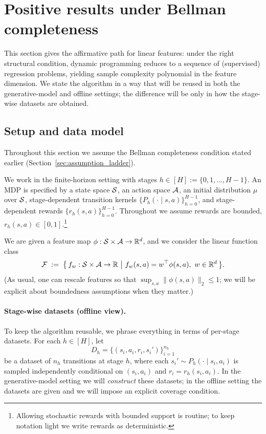 \section{Positive results under Bellman completeness}
\label{sec:BC_positive}

This section gives the affirmative path for linear features: under the right
structural condition, dynamic programming reduces to a sequence of (supervised)
regression problems, yielding sample complexity polynomial in the feature
dimension. We state the algorithm in a way that will be reused in both the
generative-model and offline settings; the difference will be only in how the
stage-wise datasets are obtained.

\subsection{Setup and data model}
\label{subsec:BC_setup}

Throughout this section we assume the Bellman completeness condition stated earlier
(Section~\ref{sec:assumption_ladder}).

We work in the finite-horizon setting with stages $h\in[H] := \{0,1,\dots,H-1\}$.
An MDP is specified by a state space $\mathcal{S}$, an action space $\mathcal{A}$, an initial
distribution $\mu$ over $\mathcal{S}$, stage-dependent transition kernels
$\{P_h(\cdot\mid s,a)\}_{h=0}^{H-1}$, and stage-dependent rewards
$\{r_h(s,a)\}_{h=0}^{H-1}$. Throughout we assume rewards are bounded,
$r_h(s,a)\in[0,1]$.\footnote{Allowing stochastic rewards with bounded support is
routine; to keep notation light we write rewards as deterministic.}

We are given a feature map $\phi:\mathcal{S}\times\mathcal{A}\to\mathbb{R}^d$, and we consider the
linear function class
\[
\Fcal \;:=\; \bigl\{\, f_w:\Scal\times\Acal\to\R \ \big|\ f_w(s,a)=w^\top\phi(s,a),\ w\in\R^d \,\bigr\}.
\]
(As usual, one can rescale features so that $\sup_{s,a}\|\phi(s,a)\|_2\le 1$; we
will be explicit about boundedness assumptions when they matter.)

\paragraph{Stage-wise datasets (offline view).}
To keep the algorithm reusable, we phrase everything in terms of per-stage
datasets. For each $h\in[H]$, let
\[
D_h = \{(s_i,a_i,r_i,s_i')\}_{i=1}^{n_h}
\]
be a dataset of $n_h$ transitions at stage $h$, where each
$s_i'\sim P_h(\cdot\mid s_i,a_i)$ is sampled independently conditional on
$(s_i,a_i)$ and $r_i=r_h(s_i,a_i)$.
In the generative-model setting we will \emph{construct} these datasets; in the
offline setting the datasets are given and we will impose an explicit coverage
condition.

